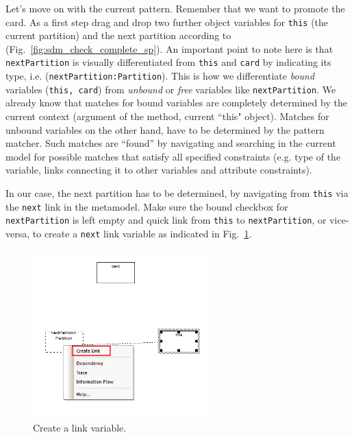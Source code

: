 Let's move on with the current pattern. Remember that we want to promote the
card.  As a first step drag and drop two further object variables for
\texttt{this} (the current partition) and the next partition according to
(Fig.~\ref{fig:sdm_check_complete_sp}).  An important point to note here is
that \texttt{nextPartition} is visually differentiated from \texttt{this} and
\texttt{card} by indicating its type, i.e. (\texttt{nextPartition:Partition}). 
This is how we differentiate \emph{bound} variables (\texttt{this, card}) from
\emph{unbound} or \emph{free} variables like \texttt{nextPartition}.  We already
know that matches for bound variables are completely determined by the current
context (argument of the method, current ``this" object).  Matches for unbound
variables on the other hand, have to be determined by the pattern matcher.  Such
matches are ``found'' by navigating and searching in the current model for
possible matches that satisfy all specified constraints (e.g. type of the
variable, links connecting it to other variables and attribute constraints).  

In our case, the next partition has to be determined, by navigating from
\texttt{this} via the \texttt{next} link in the metamodel.  Make sure the bound
checkbox for \texttt{nextPartition} is left empty and quick link from
\texttt{this} to \texttt{nextPartition}, or vice-versa, to create a
\texttt{next} link variable as indicated in
Fig.~\ref{fig:sdm_check_link_variable}. 

\clearpage

\begin{figure}[htbp]
\begin{center}
  \includegraphics[width=0.6\textwidth]{pics/sdmBilder/check/sdm26}
  \caption{Create a link variable.}  
  \label{fig:sdm_check_link_variable}
\end{center}
\end{figure}

